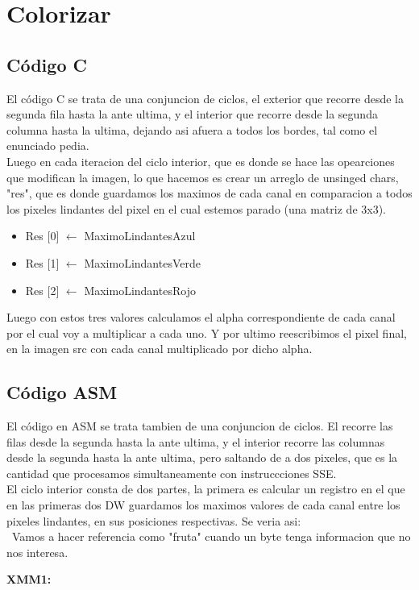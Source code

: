 \section{Colorizar}

\subsection{Código C}
	El código C se trata de una conjuncion de ciclos, el exterior que recorre desde la segunda fila hasta la ante ultima,  y el interior que recorre desde la segunda columna hasta la ultima, dejando asi afuera a todos los bordes, tal como el enunciado pedia. \\ Luego en cada iteracion del ciclo interior, que es donde se hace las opearciones que modifican la imagen, lo que hacemos es crear un arreglo de unsinged chars, "res", que es  donde guardamos los maximos de cada canal en comparacion a todos  los pixeles lindantes del pixel en el cual estemos parado (una matriz de 3x3).
\begin{itemize}
\item {Res $[$0$]$ $\leftarrow$ MaximoLindantesAzul}
\item {Res $[$1$]$ $\leftarrow$ MaximoLindantesVerde}
\item {Res $[$2$]$ $\leftarrow$ MaximoLindantesRojo}
\end{itemize}
Luego con estos tres valores calculamos el alpha correspondiente de cada canal por el cual voy a multiplicar a cada uno. Y por ultimo reescribimos el pixel final, en la imagen src con cada canal multiplicado  por dicho alpha.

\subsection{Código ASM}
	El código en ASM se trata tambien de una conjuncion de ciclos. El recorre las filas desde la segunda hasta la ante ultima, y el interior recorre las columnas desde la segunda hasta la ante ultima, pero saltando de a dos pixeles, que es la cantidad que procesamos simultaneamente con instruccciones SSE. \\
	El ciclo interior consta de dos partes, la primera es calcular un registro en el que en las primeras dos DW guardamos los maximos valores de cada canal entre los pixeles lindantes, en sus posiciones respectivas. Se veria asi:\\
\ Vamos a hacer referencia como "fruta" cuando un byte tenga informacion que no nos interesa.
\par{\textbf{XMM1:}}
	
